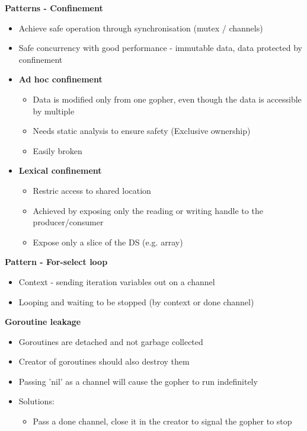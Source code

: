 \documentclass[10pt, landscape]{article}
\begin{document}
\begin{multicols}{4}
\textbf{Patterns - Confinement} \\
\begin{itemize}
    \item Achieve safe operation through synchronisation (mutex / channels)
    \item Safe concurrency with good performance - immutable data, data protected by confinement 
    \item \textbf{Ad hoc confinement}
    \begin{itemize}
        \item Data is modified only from one gopher, even though the data is accessible by multiple 
        \item Needs static analysis to ensure safety (Exclusive ownership)
        \item Easily broken 
    \end{itemize}
    \item \textbf{Lexical confinement}
    \begin{itemize}
        \item Restric access to shared location
        \item Achieved by exposing only the reading or writing handle to the producer/consumer 
        \item Expose only a slice of the DS (e.g. array)
    \end{itemize}
\end{itemize}

\textbf{Pattern - For-select loop} \\
\begin{itemize}
    \item Context - sending iteration variables out on a channel
    \item Looping and waiting to be stopped (by context or done channel)
\end{itemize}

\textbf{Goroutine leakage} \\
\begin{itemize}
    \item Goroutines are detached and not garbage collected
    \item Creator of goroutines should also destroy them 
    \item Passing 'nil' as a channel will cause the gopher to run indefinitely
    \item Solutions:
    \begin{itemize}
        \item Pass a done channel, close it in the creator to signal the gopher to stop
    \end{itemize}
\end{itemize}


\end{multicols}
\end{document}
